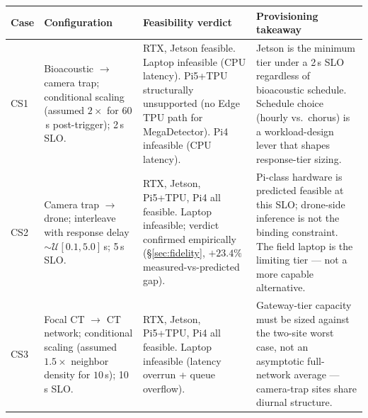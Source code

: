 %
%

\begin{table}[t]
  \centering
  \small
  \begin{tabular}{p{} p{} p{} p{}}
    \toprule
    \textbf{Case} & \textbf{Configuration} & \textbf{Feasibility verdict} & \textbf{Provisioning takeaway} \\
    \midrule
    CS1 & Bioacoustic $\rightarrow$ camera trap; conditional scaling (assumed $2\times$ for $60$\,s post-trigger); 2\,s SLO. & RTX, Jetson feasible. Laptop infeasible (CPU latency). Pi5+TPU structurally unsupported (no Edge TPU path for MegaDetector). Pi4 infeasible (CPU latency). & Jetson is the minimum tier under a 2\,s SLO regardless of bioacoustic schedule. Schedule choice (hourly vs.\ chorus) is a workload-design lever that shapes response-tier sizing. \\
    \addlinespace
    CS2 & Camera trap $\rightarrow$ drone; interleave with response delay $\sim \mathcal{U}[0.1, 5.0]$\,s; 5\,s SLO. & RTX, Jetson, Pi5+TPU, Pi4 all feasible. Laptop infeasible; verdict confirmed empirically (\S\ref{sec:fidelity}, $+23.4\%$ measured-vs-predicted gap). & Pi-class hardware is predicted feasible at this SLO; drone-side inference is not the binding constraint. The field laptop is the limiting tier --- not a more capable alternative. \\
    \addlinespace
    CS3 & Focal CT $\rightarrow$ CT network; conditional scaling (assumed $1.5\times$ neighbor density for $10$\,s); 10\,s SLO. & RTX, Jetson, Pi5+TPU, Pi4 all feasible. Laptop infeasible (latency overrun + queue overflow). & Gateway-tier capacity must be sized against the two-site worst case, not an asymptotic full-network average --- camera-trap sites share diurnal structure. \\

\end{tabular}
\end{table}
